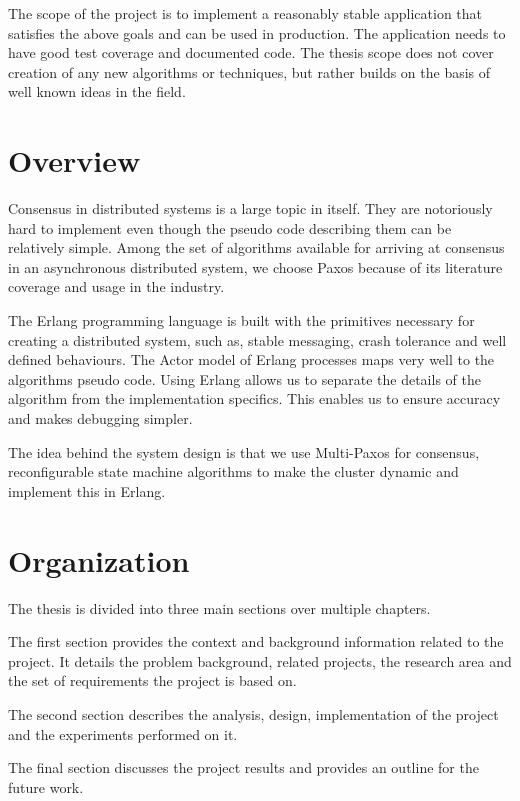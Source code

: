 The scope of the project is to implement a reasonably stable application that
satisfies the above goals and can be used in production. The application needs
to have good test coverage and documented code. The thesis scope does not cover
creation of any new algorithms or techniques, but rather builds on the basis of
well known ideas in the field.

\section{Overview}

Consensus in distributed systems is a large topic in itself. They are
notoriously hard to implement even though the pseudo code describing them can be
relatively simple. Among the set of algorithms available for arriving at
consensus in an asynchronous distributed system, we choose Paxos because of its
literature coverage and usage in the industry.

The Erlang programming language is built with the primitives necessary for
creating a distributed system, such as, stable messaging, crash tolerance and
well defined behaviours. The Actor model of Erlang processes maps very well to 
the algorithms pseudo code. Using Erlang allows us to separate the details of
the algorithm from the implementation specifics. This enables us to ensure
accuracy and makes debugging simpler.

The idea behind the system design is that we use Multi-Paxos for consensus,
reconfigurable state machine algorithms to make the cluster dynamic and
implement this in Erlang.

\section{Organization}
The thesis is divided into three main sections over multiple chapters.

The first section provides the context and background information related to the
project. It details the problem background, related projects, the research
area and the set of requirements the project is based on.

The second section describes the analysis, design, implementation of the project
and the experiments performed on it.

The final section discusses the project results and provides an outline for
the future work.

